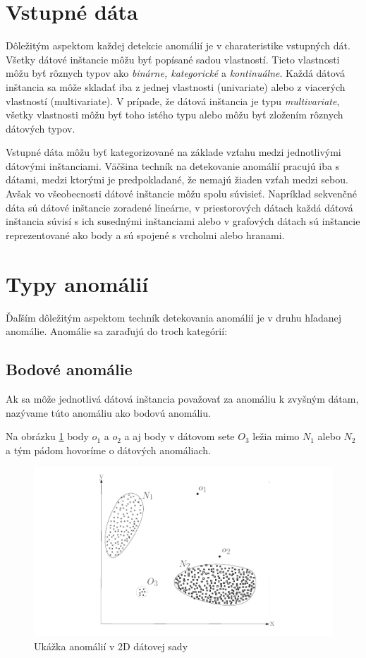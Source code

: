 \section{Vstupné dáta}
 Dôležitým aspektom každej detekcie anomálií je v charateristike vstupných dát. Všetky dátové inštancie môžu byť popísané sadou vlastností. Tieto vlastnosti môžu byť rôznych typov ako \emph{binárne, kategorické} a \emph{kontinuálne}. Každá dátová inštancia sa môže skladať iba z jednej vlastnosti (univariate) alebo z viacerých vlastností (multivariate). V prípade, že dátová inštancia je typu \emph{multivariate}, všetky vlastnosti môžu byť toho istého typu alebo môžu byť zložením rôznych dátových typov.\cite{Chandola}\par
 Vstupné dáta môžu byť kategorizované na základe vzťahu medzi jednotlivými dátovými inštanciami. Väčšina techník na detekovanie anomálií pracujú iba s dátami, medzi ktorými je predpokladané, že nemajú žiaden vzťah medzi sebou. Avšak vo všeobecnosti dátové inštancie môžu spolu súvisieť. Napríklad sekvenčné dáta sú dátové inštancie zoradené lineárne, v priestorových dátach  každá dátová inštancia súvisí s ich susednými inštanciami alebo v grafových dátach sú inštancie reprezentované ako body a sú spojené s vrcholmi alebo hranami.\cite{Chandola}
 
 \section{Typy anomálií}
 Ďaľším dôležitým aspektom techník detekovania anomálií je v druhu hľadanej anomálie. Anomálie sa zaraďujú do troch kategórií:
 \subsection{Bodové anomálie}
Ak sa môže jednotlivá dátová inštancia považovať za anomáliu k zvyšným dátam, nazývame túto anomáliu ako bodovú anomáliu.\par Na obrázku \ref{2d} body $o_1$ a $o_2$ a aj body v dátovom sete $O_3$ ležia mimo $N_1$ alebo $N_2$ a tým pádom hovoríme o dátových anomáliach.\cite{Chandola}
 \begin{figure}[!ht]
 \includegraphics[width=1\textwidth]{obrazky-figures/anomalie_2d_sade.png}
\caption{Ukážka anomálií v 2D dátovej sady\cite{Chandola}}
\centering
\label{2d}
\end{figure}
